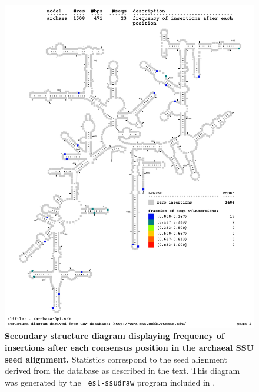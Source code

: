 \begin{figure}
\begin{center}
\includegraphics[width=5.5in]{../../seeds/ss-diagrams/archaea-0p1-ins}
\end{center}
\caption[Secondary structure diagram displaying frequency of insertions
  after each consensus position in the archaeal SSU seed
  alignment]{\textbf{Secondary structure diagram displaying frequency
  of insertions after each consensus position in the archaeal SSU seed
  alignment.} Statistics correspond to the  seed
  alignment derived from the  database \cite{CannoneGutell02}
  as described in the text. This diagram was generated by the {\tt
  esl-ssudraw} program included in .}
\label{fig:arcins}
\end{figure}


